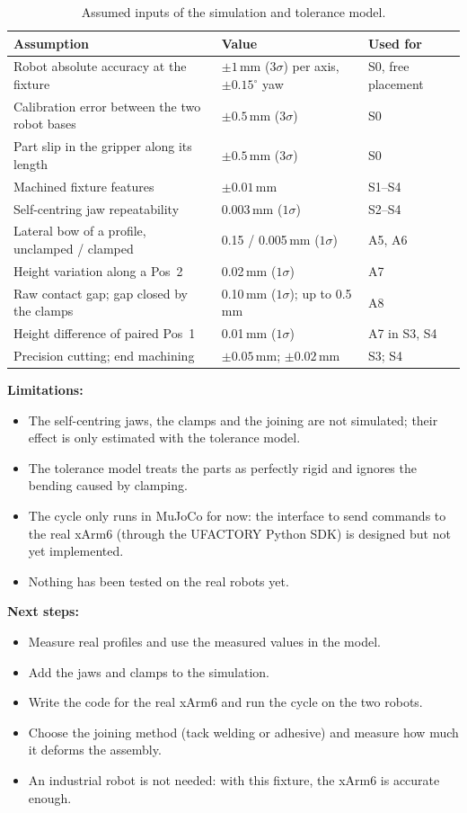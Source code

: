 \documentclass[11pt,a4paper]{article}
\begin{document}
\begin{table}[H]
\centering
\caption{Assumed inputs of the simulation and tolerance model.}
\begin{tabularx}{\textwidth}{@{}L l l@{}}
\toprule
Assumption & Value & Used for\\
\midrule
Robot absolute accuracy at the fixture & $\pm1$\,mm ($3\sigma$) per axis, $\pm0.15^\circ$ yaw & S0,
free placement\\
Calibration error between the two robot bases & $\pm0.5$\,mm ($3\sigma$) & S0\\
Part slip in the gripper along its length & $\pm0.5$\,mm ($3\sigma$) & S0\\
Machined fixture features & $\pm0.01$\,mm & S1--S4\\
Self-centring jaw repeatability & 0.003\,mm ($1\sigma$) & S2--S4\\
Lateral bow of a profile, unclamped / clamped & 0.15 / 0.005\,mm ($1\sigma$) & A5, A6\\
Height variation along a Pos~2 & 0.02\,mm ($1\sigma$) & A7\\
Raw contact gap; gap closed by the clamps & 0.10\,mm ($1\sigma$); up to 0.5\,mm & A8\\
Height difference of paired Pos~1 & 0.01\,mm ($1\sigma$) & A7 in S3, S4\\
Precision cutting; end machining & $\pm0.05$\,mm; $\pm0.02$\,mm & S3; S4\\
\bottomrule
\end{tabularx}
\end{table}

\textbf{Limitations:}
\begin{itemize}
  \item The self-centring jaws, the clamps and the joining are not simulated; their effect is only
        estimated with the tolerance model.
  \item The tolerance model treats the parts as perfectly rigid and ignores the bending caused by
        clamping.
  \item The cycle only runs in MuJoCo for now: the interface to send commands to the real xArm6
        (through the UFACTORY Python SDK) is designed but not yet implemented.
  \item Nothing has been tested on the real robots yet.
\end{itemize}

\textbf{Next steps:}
\begin{itemize}
  \item Measure real profiles and use the measured values in the model.
  \item Add the jaws and clamps to the simulation.
  \item Write the code for the real xArm6 and run the cycle on the two robots.
  \item Choose the joining method (tack welding or adhesive) and measure how much it deforms the
        assembly.
  \item An industrial robot is not needed: with this fixture, the xArm6 is accurate enough.
\end{itemize}
\end{document}
